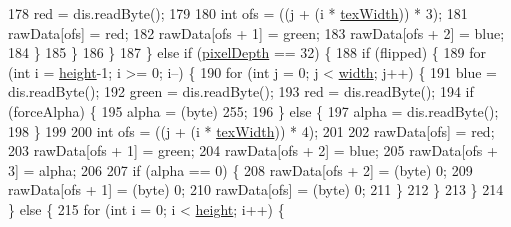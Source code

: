 \begin{DoxyCode}
178                         red = dis.readByte();
179                         
180                         \textcolor{keywordtype}{int} ofs = ((j + (i * \mbox{\hyperlink{classorg_1_1newdawn_1_1slick_1_1opengl_1_1_t_g_a_image_data_a1597fcbecdd0d2875a3950ebe60b2582}{texWidth}})) * 3);
181                         rawData[ofs] = red;
182                         rawData[ofs + 1] = green;
183                         rawData[ofs + 2] = blue;
184                     \}
185                 \}
186             \}
187         \} \textcolor{keywordflow}{else} \textcolor{keywordflow}{if} (\mbox{\hyperlink{classorg_1_1newdawn_1_1slick_1_1opengl_1_1_t_g_a_image_data_aa9222304ea8eae0cae78ff6ff0a7f8f2}{pixelDepth}} == 32) \{
188             \textcolor{keywordflow}{if} (flipped) \{
189                 \textcolor{keywordflow}{for} (\textcolor{keywordtype}{int} i = \mbox{\hyperlink{classorg_1_1newdawn_1_1slick_1_1opengl_1_1_t_g_a_image_data_ae129d18b6db032f7ef0ab8ebc795843b}{height}}-1; i >= 0; i--) \{
190                     \textcolor{keywordflow}{for} (\textcolor{keywordtype}{int} j = 0; j < \mbox{\hyperlink{classorg_1_1newdawn_1_1slick_1_1opengl_1_1_t_g_a_image_data_a76539de4fa236043b0f8b31b0ce7c1cf}{width}}; j++) \{
191                         blue = dis.readByte();
192                         green = dis.readByte();
193                         red = dis.readByte();
194                         \textcolor{keywordflow}{if} (forceAlpha) \{
195                             alpha = (byte) 255;
196                         \} \textcolor{keywordflow}{else} \{
197                             alpha = dis.readByte();
198                         \}
199                         
200                         \textcolor{keywordtype}{int} ofs = ((j + (i * \mbox{\hyperlink{classorg_1_1newdawn_1_1slick_1_1opengl_1_1_t_g_a_image_data_a1597fcbecdd0d2875a3950ebe60b2582}{texWidth}})) * 4);
201                         
202                         rawData[ofs] = red;
203                         rawData[ofs + 1] = green;
204                         rawData[ofs + 2] = blue;
205                         rawData[ofs + 3] = alpha;
206                         
207                         \textcolor{keywordflow}{if} (alpha == 0) \{
208                             rawData[ofs + 2] = (byte) 0;
209                             rawData[ofs + 1] = (byte) 0;
210                             rawData[ofs] = (byte) 0;
211                         \}
212                     \}
213                 \}
214             \} \textcolor{keywordflow}{else} \{
215                 \textcolor{keywordflow}{for} (\textcolor{keywordtype}{int} i = 0; i < \mbox{\hyperlink{classorg_1_1newdawn_1_1slick_1_1opengl_1_1_t_g_a_image_data_ae129d18b6db032f7ef0ab8ebc795843b}{height}}; i++) \{

\end{DoxyCode}
